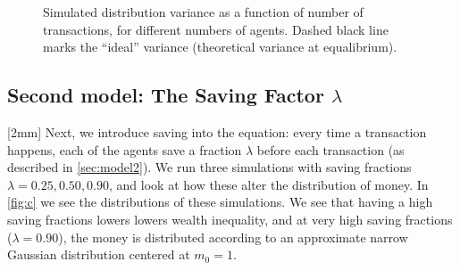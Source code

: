 \documentclass[12pt,a4paper]{article}
\newcommand\oppg[1]{\reversemarginnote{\textcolor{black!40}{#1)}}[2mm]}
\begin{document}
\begin{figure}[!ht]
  \centering

  \caption{Simulated distribution variance as a function of number of transactions, for different numbers of agents. Dashed black line marks the ``ideal'' variance (theoretical variance at equalibrium).} \label{fig:a-equalibrium}
\end{figure}

\subsection{Second model: The Saving Factor $\lambda$}

\clearpage
\oppg{c}
Next, we introduce saving into the equation: every time a transaction happens, each of the agents save a fraction $\lambda$ before each transaction (as described in \cref{sec:model2}). We run three simulations with saving fractions $\lambda = 0.25, 0.50, 0.90$, and look at how these alter the distribution of money. In \cref{fig:c} we see the distributions of these simulations. We see that having a high saving fractions lowers lowers wealth inequality, and at very high saving fractions ($\lambda = 0.90$), the money is distributed according to an approximate narrow Gaussian distribution centered at $m_0 = 1$.
\end{document}
